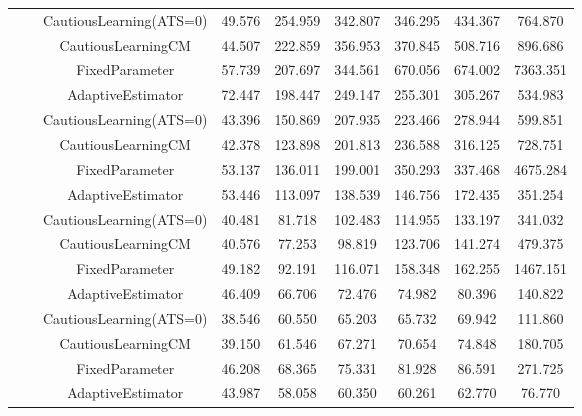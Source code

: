 \begin{table}[!h]
\begin{tabular}[t]{ccccccccc}
 &  & CautiousLearning(ATS=0) & 49.576 & 254.959 & 342.807 & 346.295 & 434.367 & 764.870\\

 &  & CautiousLearningCM & 44.507 & 222.859 & 356.953 & 370.845 & 508.716 & 896.686\\

 & \multirow[t]{-4}{*}{\centering\arraybackslash 0.25} & FixedParameter & 57.739 & 207.697 & 344.561 & 670.056 & 674.002 & 7363.351\\
\cmidrule{2-9}
 &  & AdaptiveEstimator & 72.447 & 198.447 & 249.147 & 255.301 & 305.267 & 534.983\\

 &  & CautiousLearning(ATS=0) & 43.396 & 150.869 & 207.935 & 223.466 & 278.944 & 599.851\\

 &  & CautiousLearningCM & 42.378 & 123.898 & 201.813 & 236.588 & 316.125 & 728.751\\

 & \multirow[t]{-4}{*}{\centering\arraybackslash 0.35} & FixedParameter & 53.137 & 136.011 & 199.001 & 350.293 & 337.468 & 4675.284\\
\cmidrule{2-9}
 &  & AdaptiveEstimator & 53.446 & 113.097 & 138.539 & 146.756 & 172.435 & 351.254\\

 &  & CautiousLearning(ATS=0) & 40.481 & 81.718 & 102.483 & 114.955 & 133.197 & 341.032\\

 &  & CautiousLearningCM & 40.576 & 77.253 & 98.819 & 123.706 & 141.274 & 479.375\\

 & \multirow[t]{-4}{*}{\centering\arraybackslash 0.50} & FixedParameter & 49.182 & 92.191 & 116.071 & 158.348 & 162.255 & 1467.151\\
\cmidrule{2-9}
 &  & AdaptiveEstimator & 46.409 & 66.706 & 72.476 & 74.982 & 80.396 & 140.822\\

 &  & CautiousLearning(ATS=0) & 38.546 & 60.550 & 65.203 & 65.732 & 69.942 & 111.860\\

 &  & CautiousLearningCM & 39.150 & 61.546 & 67.271 & 70.654 & 74.848 & 180.705\\

 & \multirow[t]{-4}{*}{\centering\arraybackslash 0.75} & FixedParameter & 46.208 & 68.365 & 75.331 & 81.928 & 86.591 & 271.725\\
\cmidrule{2-9}
 &  & AdaptiveEstimator & 43.987 & 58.058 & 60.350 & 60.261 & 62.770 & 76.770\\


\end{tabular}
\end{table}
